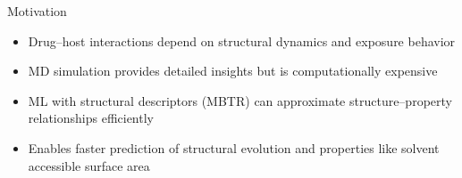 \documentclass[aspectratio=169]{beamer}
\begin{document}
\begin{frame}{Motivation}
      \begin{itemize}
        \item Drug–host interactions depend on structural dynamics and exposure behavior
        \item MD simulation provides detailed insights but is computationally expensive
        \item ML with structural descriptors (MBTR) can approximate structure–property relationships efficiently
        \item Enables faster prediction of structural evolution and properties like solvent accessible surface area
        
      \end{itemize}
      
\end{frame}
\end{document}
